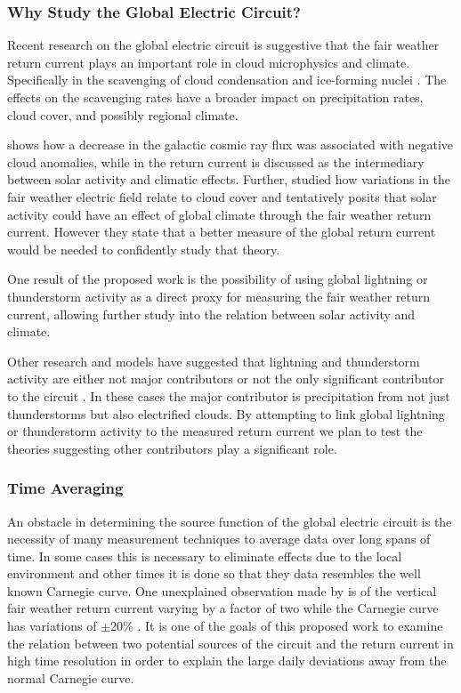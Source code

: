 \documentclass[12pt, letterpaper, onecolumn, oneside]{article}
\begin{document}
\subsubsection*{Why Study the Global Electric Circuit?}

Recent research on the global electric circuit is suggestive that the fair weather return current plays an important role in cloud microphysics and climate. Specifically in the scavenging of cloud condensation and ice-forming nuclei \citep{Tinsley2007}. The effects on the scavenging rates have a broader impact on precipitation rates, cloud cover, and possibly regional climate. 
 
\citet{Kniveton2004} shows how a decrease in the galactic cosmic ray flux was associated with negative cloud anomalies, while in \citet{Siingh2007} the return current is discussed as the intermediary between solar activity and climatic effects. Further, \citet{Kniveton2008} studied how variations in the fair weather electric field relate to cloud cover and tentatively posits that solar activity could have an effect of global climate through the fair weather return current. However they state that a better measure of the global return current would be needed to confidently study that theory.
 
One result of the proposed work is the possibility of using global lightning or thunderstorm activity as a direct proxy for measuring the fair weather return current, allowing further study into the relation between solar activity and climate.

Other research and models have suggested that lightning and thunderstorm activity are either not major contributors or not the only significant contributor to the circuit \citep{Rycroft2008,Liu2010}. In these cases the major contributor is precipitation from not just thunderstorms but also electrified clouds. By attempting to link global lightning or thunderstorm activity to the measured return current we plan to test the theories suggesting other contributors play a significant role.

\subsubsection*{Time Averaging}

An obstacle in determining the source function of the global electric circuit is the necessity of many measurement techniques to average data over long spans of time. In some cases this is necessary to eliminate effects due to the local environment and other times it is done so that they data resembles the well known Carnegie curve. One unexplained observation made by \citet{Holzworth1984} is of the vertical fair weather return current varying by a factor of two while the Carnegie curve has variations of $\pm20$\% \citep{Whipple1929}. It is one of the goals of this proposed work to examine the relation between two potential sources of the circuit and the return current in high time resolution in order to explain the large daily deviations away from the normal Carnegie curve.
\end{document}
